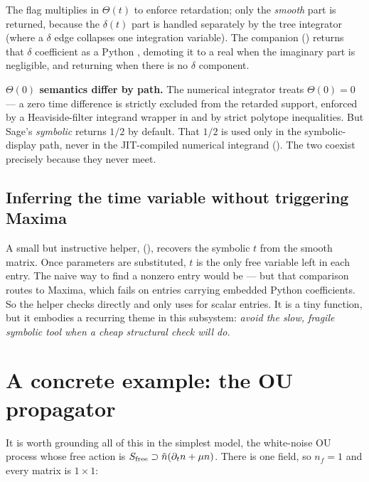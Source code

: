 The  flag multiplies in $\Theta(t)$ to enforce
retardation; only the \emph{smooth} part is returned, because the $\delta(t)$ part
is handled separately by the tree integrator (where a $\delta$ edge collapses one
integration variable). The companion 
() returns that $\delta$ coefficient as a Python
, demoting it to a real  when the imaginary part is
negligible, and returning  when there is no $\delta$ component.

\begin{gotcha}
\textbf{$\Theta(0)$ semantics differ by path.} The numerical integrator treats
$\Theta(0) = 0$ --- a zero time difference is strictly excluded from the retarded
support, enforced by a Heaviside-filter integrand wrapper in
 and by strict polytope inequalities. But Sage's
\emph{symbolic}  returns $1/2$ by default. That $1/2$ is used
only in the symbolic-display path, never in the JIT-compiled numerical integrand
(). The two coexist precisely because they never meet.
\end{gotcha}

\subsection{Inferring the time variable without triggering Maxima}

A small but instructive helper, 
(), recovers the symbolic $t$ from the smooth matrix.
Once parameters are substituted, $t$ is the only free variable left in each
entry. The naive way to find a nonzero entry would be  --- but
that comparison routes to Maxima, which fails on entries carrying embedded Python
 coefficients. So the helper checks 
directly and only uses  for scalar entries. It is a tiny
function, but it embodies a recurring theme in this subsystem: \emph{avoid the
slow, fragile symbolic tool when a cheap structural check will do.}

\section{A concrete example: the OU propagator}

It is worth grounding all of this in the simplest model, the white-noise OU
process whose free action is $S_{\mathrm{free}} \supset \tilde n(\partial_t n + \mu n)$.
There is one field, so $n_f = 1$ and every matrix is $1\times1$:

